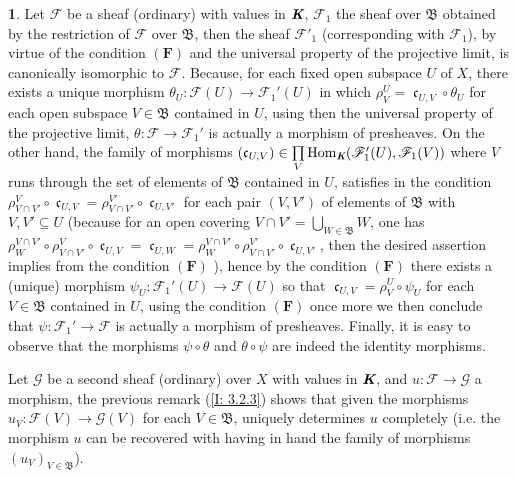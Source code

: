 \documentclass[12pt]{amsart}
\newcommand{\Hom}{\operatorname{Hom}}
\newcommand{\can}{\operatorname{\mathfrak{c}}}
\theoremstyle{definition}
\newtheorem{bk}[proposition]{}
\begin{document}
\begin{bk}\label{I: 3.2.5} Let $\mathscr{F}$ be a sheaf (ordinary) with values in $\emph{\textbf{K}}$, $\mathscr{F}_{1}$ the sheaf over $\mathfrak{B}$ obtained by the restriction of $\mathscr{F}$ over $\mathfrak{B}$, then the sheaf  $\mathscr{F}'_{1}$ (corresponding with $\mathscr{F}_{1}$), by virtue of the condition $(\textbf{F})$ and the universal property of the projective limit, is canonically isomorphic to $\mathscr{F}$. Because, for each fixed open subspace $U$ of $X$, there exists a unique morphism $\theta_{U}:\mathscr{F}(U)\rightarrow\mathscr{F}_{1}'(U)$ in which  $\rho_{V}^{U}=\can_{U, V}\circ\theta_{U}$ for each open subspace $V\in\mathfrak{B}$ contained in $U$, using then the universal property of the projective limit, $\theta:\mathscr{F}\rightarrow\mathscr{F}_{1}'$ is actually a morphism of presheaves. On the other hand, the family of morphisms $(\can_{U, V})\in\prod\limits_{V}
\Hom_{\emph{\textbf{K}}}(\mathscr{F}_{1}'(U), \mathscr{F}_{1}(V))$ where $V$ runs through the set of elements of $\mathfrak{B}$ contained in $U$, satisfies in the condition $\rho_{V\cap V'}^{V}\circ\can_{U,V}=\rho_{V\cap V'}^{V'}\circ\can_{U,V'}$ for each pair $(V, V')$ of elements of $\mathfrak{B}$ with $V, V'\subseteq U$ (because for an open covering $V\cap V'=\bigcup\limits_{W\in\mathfrak{B}}W$, one has $\rho_{W}^{V\cap V'}\circ\rho_{V\cap V'}^{V}\circ\can_{U,V}=\can_{U,W}=\rho_{W}^{V\cap V'}\circ\rho_{V\cap V'}^{V'}\circ\can_{U,V'}$, then the desired assertion implies from the condition $(\textbf{F})$ ), hence by the condition $(\textbf{F})$ there exists a (unique) morphism $\psi_{U}:\mathscr{F}_{1}'(U)\rightarrow\mathscr{F}(U)$ so that $\can_{U,V}=\rho_{V}^{U}\circ\psi_{U}$ for each $V\in\mathfrak{B}$ contained in $U$,  using the condition $(\textbf{F})$ once more we then conclude that $\psi:\mathscr{F}_{1}'\rightarrow\mathscr{F}$ is actually a morphism of presheaves. Finally, it is easy to observe that the morphisms $\psi\circ\theta$ and $\theta\circ\psi$ are indeed the identity morphisms.

Let $\mathscr{G}$ be a second sheaf (ordinary) over $X$ with values in $\emph{\textbf{K}}$, and $u:\mathscr{F}\rightarrow\mathscr{G}$ a morphism, the previous remark (\ref{I: 3.2.3}) shows that given the morphisms $u_{V}:\mathscr{F}(V)\rightarrow\mathscr{G}(V)$ for each $V\in\mathfrak{B}$, uniquely determines $u$ completely (i.e. the morphism $u$ can be recovered with having in hand the family of morphisms $(u_{V})_{V\in\mathfrak{B}}$). 

\end{bk}
\end{document}
